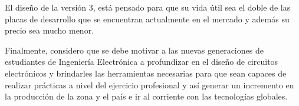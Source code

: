 \documentclass[times, 10pt,twocolumn]{article}
\begin{document}
El diseño de la versión 3, está pensado para que su vida útil sea el doble de las placas de desarrollo que se encuentran actualmente en el mercado y además su precio sea mucho menor.

Finalmente, considero que se debe motivar a las nuevas generaciones de estudiantes de Ingeniería Electrónica a profundizar en el diseño de circuitos
electrónicos y brindarles las herramientas necesarias para que sean capaces de realizar prácticas a nivel del ejercicio profesional y así generar un incremento en la producción de la zona y el país e ir al corriente con las tecnologías globales.

%

\end{document}
